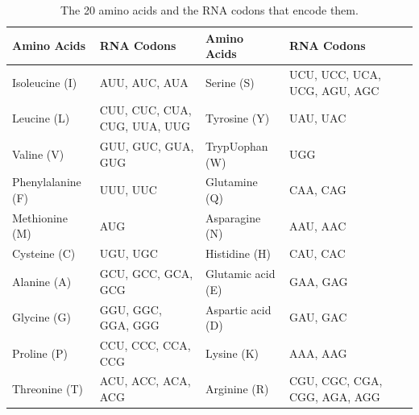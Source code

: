 \begin{table}
\small
\centering
\begin{tabular}{|l|p{3cm}|l|p{3cm}|l|l|}
\hline
\textbf{Amino Acids} & \textbf{RNA Codons}          & \textbf{Amino Acids} & \textbf{RNA Codons}          \\ \hline
Isoleucine (I)       & AUU, AUC, AUA                & Serine (S)           & UCU, UCC, UCA, UCG, AGU, AGC \\ \hline
Leucine (L)          & CUU, CUC, CUA, CUG, UUA, UUG & Tyrosine (Y)         & UAU, UAC                     \\ \hline
Valine (V)           & GUU, GUC, GUA, GUG           & TrypUophan (W)       & UGG                          \\ \hline
Phenylalanine (F)    & UUU, UUC                     & Glutamine (Q)        & CAA, CAG                     \\ \hline
Methionine (M)       & AUG                          & Asparagine (N)       & AAU, AAC                     \\ \hline
Cysteine (C)         & UGU, UGC                     & Histidine (H)        & CAU, CAC                     \\ \hline
Alanine (A)          & GCU, GCC, GCA, GCG           & Glutamic acid (E)    & GAA, GAG                     \\ \hline
Glycine (G)          & GGU, GGC, GGA, GGG           & Aspartic acid (D)    & GAU, GAC                     \\ \hline
Proline (P)          & CCU, CCC, CCA, CCG           & Lysine (K)           & AAA, AAG                     \\ \hline
Threonine (T)        & ACU, ACC, ACA, ACG           & Arginine (R)         & CGU, CGC, CGA, CGG, AGA, AGG \\ \hline
\end{tabular}
\caption{The 20 amino acids and the RNA codons that encode them.\label{tab:amino-acid}}
\label{my-label}
\end{table}


